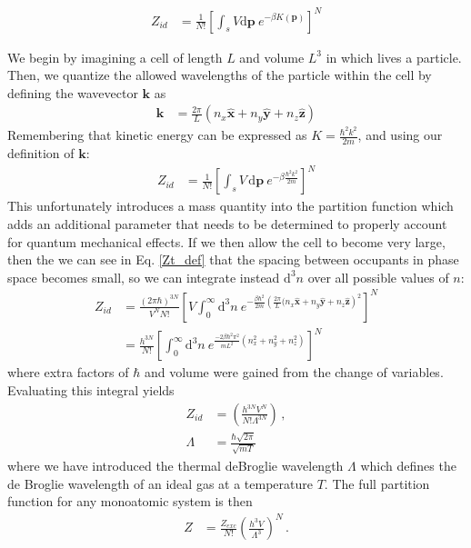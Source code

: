 \documentclass[12pt]{article}
\newcommand*{\diff}{\mathrm{d}}
\begin{document}
\begin{align}
    Z_{id} &= \frac{1}{N!}\left[\int_s V \diff\mathbf{p} ~e^{-\beta K(\mathbf{p})}\right]^{N}
\end{align}

We begin by imagining a cell of length $L$ and volume $L^3$ in which lives a particle. Then, we quantize the allowed wavelengths of the particle within the cell by defining the wavevector $\mathbf{k}$ as
\begin{align}
    \mathbf{k} &= \frac{2\pi}{L}(n_x\mathbf{\hat{x}} + n_y\mathbf{\hat{y}} + n_z\mathbf{\hat{z}})
\end{align}
Remembering that kinetic energy can be expressed as $K = \frac{\hbar^2 k^2}{2m}$, and using our definition of $\mathbf{k}$:
\begin{align}
    Z_{id} &= \frac{1}{N!}\left[\int_s V\, \diff\mathbf{p} ~e^{-\beta \frac{\hbar^2 k^2}{2m}}\right]^{N}
    \label{Zt_def}
\end{align}
This unfortunately introduces a mass quantity into the partition function which adds an additional parameter that needs to be determined to properly account for quantum mechanical effects. If we then allow the cell to become very large, then the we can see in Eq. \ref{Zt_def} that the spacing between occupants in phase space becomes small, so we can integrate instead $\diff ^3 n$ over all possible values of $n$:
\begin{align}
    Z_{id} &= \frac{(2\pi \hbar)^{3N}}{V^N N!}\left[V\int_0^\infty \diff^3 n ~e^{-\frac{\beta \hbar^2}{2m} \left(\frac{2\pi}{L}(n_x\mathbf{\hat{x}} + n_y\mathbf{\hat{y}} + n_z\mathbf{\hat{z}}\right)^2}\right]^{N} \\
    &= \frac{h^{3N}}{N!}\left[\int_0^\infty \diff^3 n ~e^{ \frac{-2\beta \hbar^2\pi^2}{mL^2}(n_x^2 + n_y^2 + n_z^2)}\right]^{N}
\end{align}
where extra factors of $\hbar $ and volume were gained from the change of variables. Evaluating this integral yields
\begin{align}
    Z_{id} &= \left(\frac{h^{3N} V^N}{N!\Lambda^{3N}}\right) \,, \\
    \Lambda &= \frac{\hbar\sqrt{2\pi}}{\sqrt{mT}}
\end{align}
where we have introduced the thermal deBroglie wavelength $\Lambda$ which defines the de Broglie wavelength of an ideal gas at a temperature $T$. The full partition function for any monoatomic system is then
\begin{align}
    Z &= \frac{Z_{exc}}{N!}\left(\frac{h^3 V}{\Lambda^{3}}\right)^{N} \,.
\end{align}
\end{document}
